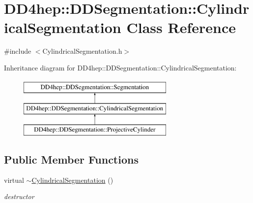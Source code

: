 \hypertarget{class_d_d4hep_1_1_d_d_segmentation_1_1_cylindrical_segmentation}{}\section{D\+D4hep\+:\+:D\+D\+Segmentation\+:\+:Cylindrical\+Segmentation Class Reference}
\label{class_d_d4hep_1_1_d_d_segmentation_1_1_cylindrical_segmentation}


{\ttfamily \#include $<$Cylindrical\+Segmentation.\+h$>$}

Inheritance diagram for D\+D4hep\+:\+:D\+D\+Segmentation\+:\+:Cylindrical\+Segmentation\+:\begin{figure}[H]
\begin{center}
\leavevmode
\includegraphics[height=3.000000cm]{class_d_d4hep_1_1_d_d_segmentation_1_1_cylindrical_segmentation}
\end{center}
\end{figure}
\subsection*{Public Member Functions}
\begin{DoxyCompactItemize}
\item 
virtual \hyperlink{class_d_d4hep_1_1_d_d_segmentation_1_1_cylindrical_segmentation_a7f069ce1b0c511e208a847ad3e5ddef7}{$\sim$\+Cylindrical\+Segmentation} ()
\begin{DoxyCompactList}\small\item\em destructor \end{DoxyCompactList}\end{DoxyCompactItemize}

